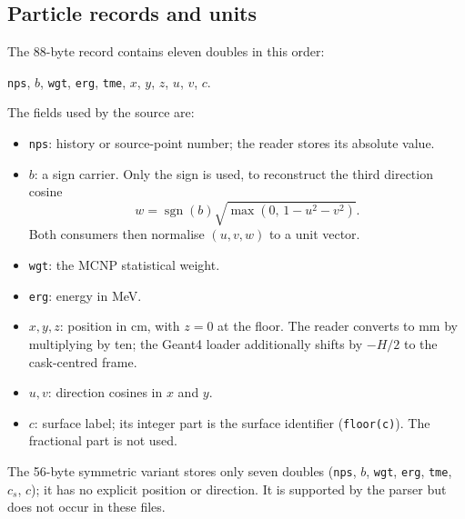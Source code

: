 \documentclass[11pt,a4paper]{article}
\begin{document}
\subsection{Particle records and units}

The 88-byte record contains eleven doubles in this order:
\begin{center}
\texttt{nps}, $b$, \texttt{wgt}, \texttt{erg}, \texttt{tme},
$x$, $y$, $z$, $u$, $v$, $c$.
\end{center}
The fields used by the source are:
\begin{itemize}
  \item \texttt{nps}: history or source-point number; the reader stores its
        absolute value.
  \item $b$: a sign carrier.  Only the sign is used, to reconstruct the third
        direction cosine
        \begin{equation}
          w = \operatorname{sgn}(b)\sqrt{\max(0,\,1-u^2-v^2)}.
        \end{equation}
        Both consumers then normalise $(u,v,w)$ to a unit vector.
  \item \texttt{wgt}: the MCNP statistical weight.
  \item \texttt{erg}: energy in MeV.
  \item $x,y,z$: position in cm, with $z=0$ at the floor.  The reader converts
        to mm by multiplying by ten; the Geant4 loader additionally shifts by
        $-H/2$ to the cask-centred frame.
  \item $u,v$: direction cosines in $x$ and $y$.
  \item $c$: surface label; its integer part is the surface identifier
        (\texttt{floor(c)}).  The fractional part is not used.
\end{itemize}
The 56-byte symmetric variant stores only seven doubles
(\texttt{nps}, $b$, \texttt{wgt}, \texttt{erg}, \texttt{tme}, $c_s$, $c$); it
has no explicit position or direction.  It is supported by the parser but does
not occur in these files.
\end{document}
